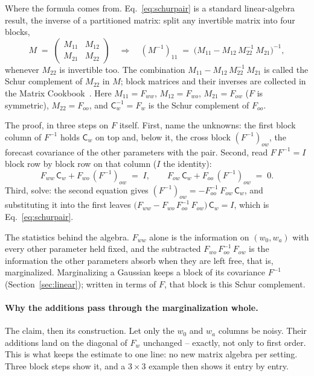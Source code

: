 \documentclass[11pt]{article}
\newcommand{\Cov}{\mathsf{C}}
\begin{document}
Where the formula comes from.  Eq.~\eqref{eq:schurpair} is a standard
linear-algebra result, the inverse of a partitioned matrix: split any
invertible matrix into four blocks,
\begin{equation*}
  M \;=\;
  \begin{pmatrix} M_{11} & M_{12} \\ M_{21} & M_{22} \end{pmatrix}
  \quad\Longrightarrow\quad
  (M^{-1})_{11} \;=\;
  \bigl(M_{11} - M_{12}\,M_{22}^{-1}\,M_{21}\bigr)^{-1} ,
\end{equation*}
whenever $M_{22}$ is invertible too.  The combination
$M_{11} - M_{12}\,M_{22}^{-1}\,M_{21}$ is called the Schur complement
of $M_{22}$ in $M$; block matrices and their inverses are collected in
the Matrix Cookbook~\cite{Petersen2012}.  Here $M_{11} = F_{ww}$,
$M_{12} = F_{wo}$, $M_{21} = F_{ow}$ ($F$ is symmetric),
$M_{22} = F_{oo}$, and $\Cov_w^{-1} = F_w$ is the Schur complement of
$F_{oo}$.

The proof, in three steps on $F$ itself.  First, name the unknowns:
the first block column of $F^{-1}$ holds $\Cov_w$ on top and, below
it, the cross block $(F^{-1})_{ow}$, the forecast covariance of the
other parameters with the pair.  Second, read $F\,F^{-1} = I$ block
row by block row on that column ($I$ the identity):
\begin{equation*}
  F_{ww}\,\Cov_w + F_{wo}\,(F^{-1})_{ow} \;=\; I ,
  \qquad
  F_{ow}\,\Cov_w + F_{oo}\,(F^{-1})_{ow} \;=\; 0 .
\end{equation*}
Third, solve: the second equation gives
$(F^{-1})_{ow} = -F_{oo}^{-1}\,F_{ow}\,\Cov_w$, and substituting it
into the first leaves
$\bigl(F_{ww} - F_{wo}\,F_{oo}^{-1}\,F_{ow}\bigr)\,\Cov_w = I$, which
is Eq.~\eqref{eq:schurpair}.

The statistics behind the algebra.  $F_{ww}$ alone is the information
on $(w_0, w_a)$ with every other parameter held fixed, and the
subtracted $F_{wo}\,F_{oo}^{-1}\,F_{ow}$ is the information the other
parameters absorb when they are left free, that is, marginalized.
Marginalizing a Gaussian keeps a block of its covariance $F^{-1}$
(Section~\ref{sec:linear}); written in terms of $F$, that block is
this Schur complement.

\paragraph{Why the additions pass through the marginalization whole.}
The claim, then its construction.  Let only the $w_0$ and $w_a$
columns be noisy.  Their additions land on the diagonal of $F_w$
unchanged -- exactly, not only to first order.  This is what keeps
the estimate to one line: no new matrix algebra per setting.  Three
block steps show it, and a $3 \times 3$ example then shows it entry
by entry.
\end{document}
